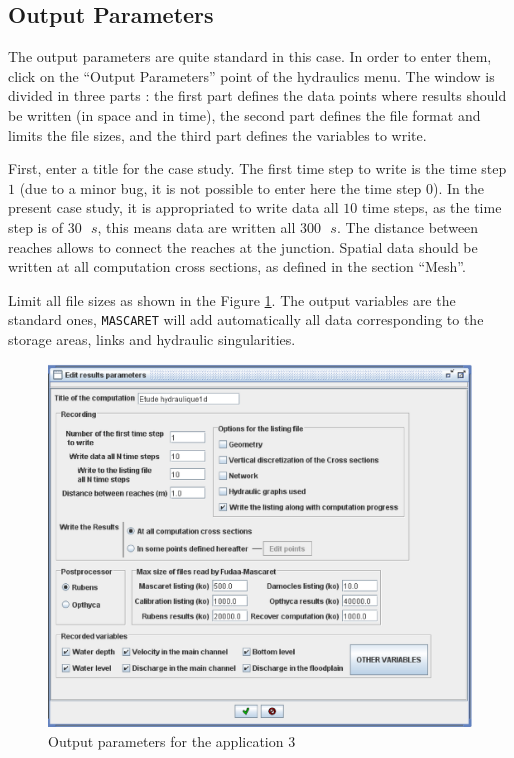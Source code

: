 \documentclass[a4paper,12pt]{article}
\begin{document}
\subsection{Output Parameters}

\hspace{0.5cm}The output parameters are quite standard in this case. In order to
enter them, click on the {}``Output Parameters'' point of the hydraulics
menu. The window is divided in three parts : the first part defines
the data points where results should be written (in space and in time),
the second part defines the file format and limits the file sizes,
and the third part defines the variables to write.

\vspace{0.5cm}

First, enter a title for the case study. The first time step to write
is the time step $1$ (due to a minor bug, it is not possible to enter
here the time step $0$). In the present case study, it is appropriated
to write data all $10$ time steps, as the time step is of $30\mbox{ }s$, this
means data are written all $300\mbox{ }s$. The distance between reaches allows
to connect the reaches at the junction. Spatial data should be
written at all computation cross sections, as defined in the section
{}``Mesh''.

\vspace{0.5cm}

Limit all file sizes as shown in the Figure \ref{fig:Output-para3}.
The output variables are the standard ones, \texttt{MASCARET} will add automatically
all data corresponding to the storage areas, links and hydraulic singularities.

\begin{figure}[h]
  \begin{center}
  \includegraphics[scale=0.5]{outpu_params}
  \caption{Output parameters for the application $3$}
  \label{fig:Output-para3}
  \end{center}
\end{figure}
\end{document}
